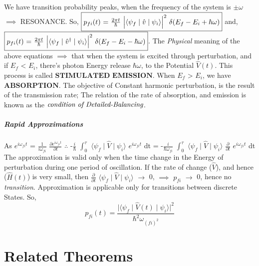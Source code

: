 \documentclass[a4paper, 10pt, onepage]{elegantbook}
\begin{document}
{We have transition probability peaks, when the frequency of the system is $\pm \omega$ $\implies$ RESONANCE. So,  
$\boxed{p_{fi} (t)$ = $\frac{2 \pi t}{\hbar}$ $\Big| \langle \psi_{f} \mid \hat{v} \mid \psi_{i} \rangle \Big|^2$ 
$\delta(E_f - E_i + \hbar \omega)}$
and,
$\boxed{p_{fi} (t)$ = $\frac{2 \pi t}{\hbar}$ $\Big| \langle \psi_f \mid \hat{v}^{\dagger} \mid \psi_{i} \rangle 
\Big|^2$ $\delta(E_f - E_i - \hbar \omega)}$.  
The \emph{Physical} meaning of the above equations $\implies$ that when the system is excited through perturbation, and 
if $E_f$ < $E_i$, there's photon Energy release $\hbar \omega$, to the Potential $\hat V (t)$. This process is called 
$\mathbf{\textbf{STIMULATED EMISSION}}$. When $E_f$ > $E_i$, we have $\mathbf{\textbf{ABSORPTION}}$. The objective of 
Constant harmonic perturbation, is the result of the transmission rate; The relation of the rate of absorption, and 
emission is known as the $\emph{condition of Detailed-Balancing}$.

\paragraph{Rapid Approximations}

\medskip

As $e^{i \omega_{fi} t}$ = $\frac{1}{i \omega_{fi}}$ $\frac{\partial e^{i \omega_{fi} t}}{\partial t}$ $\therefore$ 
-$\frac{i}{\hbar}$ $\int_0^{\tau}$ $\langle \psi_f \mid \hat V \mid \psi_i \rangle$ $e^{i \omega_{fi} t}$ dt = 
-$\frac{i}{\hbar \omega_{fi}}$ $\int_0^{\tau}$ $\langle \psi_f \mid \hat V \mid \psi_i \rangle$ 
$\frac{\partial}{\partial t}$ $e^{i \omega_{fi} t}$ dt  
The approximation is valid only when the time change in the Energy of perturbation during one period of oscillation. If 
the rate of change ($\hat V$), and hence ($\hat H(t)$) is very small, then $\frac{\partial}{\partial t}$ $\langle 
\psi_f \mid \hat V \mid \psi_i \rangle$ $\rightarrow$ 0, $\implies$ $p_{fi}$ $\rightarrow$ 0, hence no 
\emph{transition}. Approximation is applicable only for transitions between discrete States.
So,
\begin{equation}
p_{fi} (t) = \frac{\Big| \langle \psi_f \mid \hat V (t) \mid \psi_i \rangle \Big|^2}{\hbar^2 \omega_{(fi)^2}}
\end{equation}


\chapter{Related Theorems}

}
\end{document}
